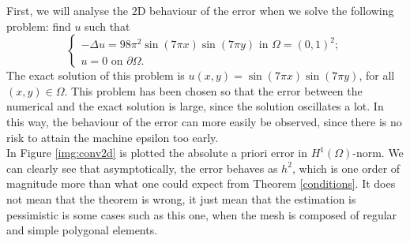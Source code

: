 First, we will analyse the $2$D behaviour of the error when we solve the following problem: find $u$ such that
\begin{equation*}
\begin{cases}
-\Delta u = 98\pi^2\sin(7\pi x)\sin(7\pi y) \text{ in } \Omega = (0,1)^2;\\
u = 0 \text{ on } \partial \Omega.
\end{cases}
\end{equation*}
The exact solution of this problem is $u(x,y)=\sin(7\pi x)\sin(7\pi y)$, for all $(x,y)\in \Omega$. This problem has been chosen so that the error between the numerical and the exact solution is large, since the solution oscillates a lot. In this way, the behaviour of the error can more easily be observed, since there is no risk to attain the machine epsilon too early. \\

In Figure \ref{img:conv2d} is plotted the absolute a priori error in $H^1(\Omega)$-norm. We can clearly see that asymptotically, the error behaves as $h^2$, which is one order of magnitude more than what one could expect from Theorem \ref{conditions}. It does not mean that the theorem is wrong, it just mean that the estimation is pessimistic is some cases such as this one, when the mesh is composed of regular and simple polygonal elements. 

